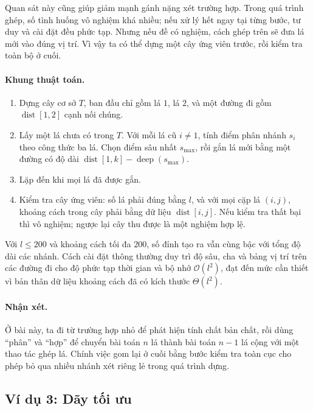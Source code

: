 \documentclass[11pt]{article}
\newcommand{\Oh}{\mathcal{O}}
\newcommand{\dist}{\operatorname{dist}}
\newcommand{\deep}{\operatorname{deep}}
\begin{document}
Quan sát này cũng giúp giảm mạnh gánh nặng xét trường hợp. Trong quá trình
ghép, số tình huống vô nghiệm khá nhiều; nếu xử lý hết ngay tại từng bước,
tư duy và cài đặt đều phức tạp. Nhưng nếu đề có nghiệm, cách ghép trên sẽ đưa
lá mới vào đúng vị trí. Vì vậy ta có thể dựng một cây ứng viên trước, rồi
kiểm tra toàn bộ ở cuối.

\paragraph{Khung thuật toán.}
\begin{enumerate}
  \item Dựng cây cơ sở \(T\), ban đầu chỉ gồm lá \(1\), lá \(2\), và một đường
        đi gồm \(\dist[1,2]\) cạnh nối chúng.
  \item Lấy một lá chưa có trong \(T\). Với mỗi lá cũ \(i\ne 1\), tính điểm
        phân nhánh \(s_i\) theo công thức ba lá. Chọn điểm sâu nhất
        \(s_{\max}\), rồi gắn lá mới bằng một đường có độ dài
        \(\dist[1,k]-\deep(s_{\max})\).
  \item Lặp đến khi mọi lá đã được gắn.
  \item Kiểm tra cây ứng viên: số lá phải đúng bằng \(l\), và với mọi cặp lá
        \((i,j)\), khoảng cách trong cây phải bằng dữ liệu \(\dist[i,j]\).
        Nếu kiểm tra thất bại thì vô nghiệm; ngược lại cây thu được là một
        nghiệm hợp lệ.
\end{enumerate}

Với \(l\le 200\) và khoảng cách tối đa \(200\), số đỉnh tạo ra vẫn cùng bậc với
tổng độ dài các nhánh. Cách cài đặt thông thường duy trì độ sâu, cha và bảng
vị trí trên các đường đi cho độ phức tạp thời gian và bộ nhớ \(\Oh(l^2)\),
đạt đến mức cần thiết vì bản thân dữ liệu khoảng cách đã có kích thước
\(\Theta(l^2)\).

\paragraph{Nhận xét.}
Ở bài này, ta đi từ trường hợp nhỏ để phát hiện tính chất bản chất, rồi dùng
``phân'' và ``hợp'' để chuyển bài toán \(n\) lá thành bài toán \(n-1\) lá cộng
với một thao tác ghép lá. Chính việc gom lại ở cuối bằng bước kiểm tra toàn cục
cho phép bỏ qua nhiều nhánh xét riêng lẻ trong quá trình dựng.

\subsection{Ví dụ 3: Dãy tối ưu}
\end{document}
